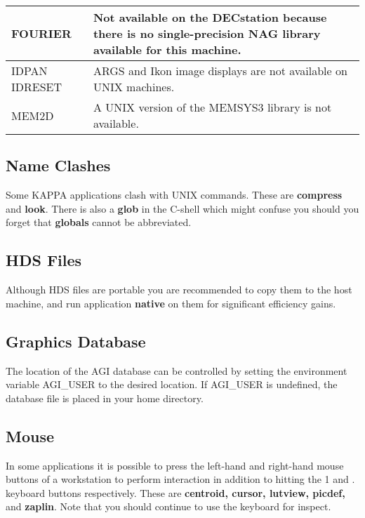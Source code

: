 {\begin{center}
\begin{tabular}{|p{18mm}|p{130mm}|}
FOURIER &  Not available on the DECstation because there is
 no single-precision NAG library available for this machine. \\ \hline

IDPAN  IDRESET  & ARGS and Ikon image displays are not available
 on UNIX machines. \\ \hline

MEM2D & A UNIX version of the MEMSYS3 library is not available. \\ \hline
\end{tabular}
\end{center}

\subsection{Name Clashes}

Some {\sc KAPPA} applications clash with UNIX commands.  These
are {\bf compress} and {\bf look}.  There is also a {\bf glob} in
the C-shell which might confuse you should you forget that {\bf
globals} cannot be abbreviated. 

\subsection{HDS Files}

Although HDS files are portable you are recommended to copy them to the
host machine, and run application {\bf native} on them for significant
efficiency gains. 

\subsection{Graphics Database}

The location of the AGI database can be controlled by setting the
environment variable AGI\_USER to the desired location.  If AGI\_USER
is undefined, the database file is placed in your home directory.

\subsection{Mouse}

In some applications it is possible to press the left-hand and
right-hand mouse buttons of a workstation to perform interaction in
addition to hitting the 1 and . keyboard buttons respectively.  These
are {\bf centroid, cursor, lutview, picdef,} and {\bf zaplin}.  Note
that you should continue to use the keyboard for inspect. 

}
